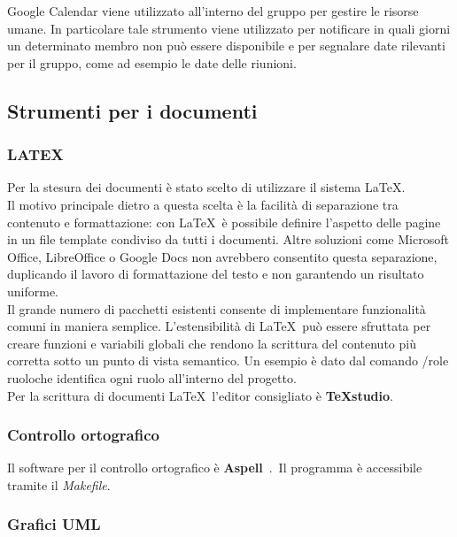 Google Calendar viene utilizzato all’interno del gruppo per gestire le risorse umane. In
particolare tale strumento viene utilizzato per notificare in quali giorni un determinato
membro non pu\`{o} essere disponibile e per segnalare date rilevanti per il gruppo, come
ad esempio le date delle riunioni.



\subsection{Strumenti per i documenti}
\subsubsection{LATEX} 
 
Per la stesura dei documenti \`{e} stato scelto di utilizzare il sistema \LaTeX.\\
Il motivo 
principale dietro a questa scelta \`{e} la facilit\`{a} di separazione tra contenuto e formattazione: 
con \LaTeX\ \`{e} possibile definire l’aspetto delle pagine in un file template condiviso da tutti i documenti. Altre soluzioni come Microsoft Office, LibreOffice o Google Docs non 
avrebbero consentito questa separazione, duplicando il lavoro di formattazione del testo 
e non garantendo un risultato uniforme.\\
Il grande numero di pacchetti esistenti consente di implementare funzionalit\`{a} comuni 
in maniera semplice. L’estensibilit\`{a} di \LaTeX\ pu\`{o} essere sfruttata per creare funzioni e 
variabili globali che rendono la scrittura del contenuto pi\`{u} corretta sotto un punto di 
vista semantico. Un esempio \`{e} dato dal comando /role \textbraceleft ruolo\textbraceright che identifica ogni ruolo 
all’interno del progetto.\\
Per la scrittura di documenti \LaTeX\  l’editor consigliato \`{e} \textbf{TeXstudio}. 

\subsubsection{Controllo ortografico}

Il software per il controllo ortografico \`{e} \textbf{Aspell}\ .\ Il programma \`{e} accessibile tramite il \emph{Makefile}.


\subsubsection{Grafici UML} 

